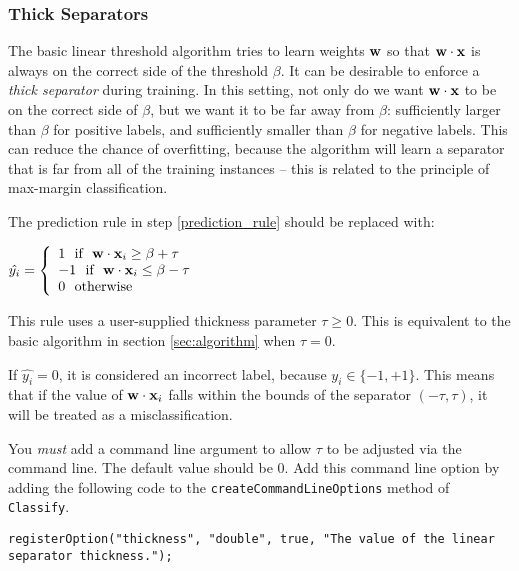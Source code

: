 \documentclass[11pt]{article}
\newcommand{\vw}{{\bf w}}
\newcommand{\vx}{{\bf x}}
\newcommand{\vxi}{{\bf x}_i}
\newcommand{\yi}{y_i}
\newcommand{\code}[1]{{\footnotesize \tt #1}}
\begin{document}
\subsubsection{Thick Separators}
\label{sec:thickness}

The basic linear threshold algorithm tries to learn weights $\vw$ so that $\vw \cdot \vx$ is always on the correct side of the threshold $\beta$. It can be desirable to enforce a {\em thick separator} during training. In this setting, not only do we want $\vw \cdot \vx$ to be on the correct side of $\beta$, but we want it to be far away from $\beta$: sufficiently larger than $\beta$ for positive labels, and sufficiently smaller than $\beta$ for negative labels.
This can reduce the chance of overfitting, because the algorithm will learn a separator that is far from all of the training instances -- this is related to the principle of max-margin classification.

The prediction rule in step \ref{prediction_rule} should be replaced with:

\vspace{0.5cm}
$\hat{\yi} =  \left\{
     \begin{array}{lr}
       1 ~~  \textrm{if} ~~ \vw \cdot \vxi \ge \beta + \tau  \\
       -1 ~~  \textrm{if} ~~ \vw \cdot \vxi \le \beta - \tau  \\
       0 ~~ \textrm{otherwise}
     \end{array}
   \right.$
\vspace{0.5cm}


This rule uses a user-supplied thickness parameter $\tau \ge 0$. This is equivalent to the basic algorithm in section \ref{sec:algorithm} when $\tau=0$.

If $\hat{\yi}=0$, it is considered an incorrect label, because $\yi \in \{-1,+1\}$. This means that if the value of $\vw \cdot \vxi$ falls within the bounds of the separator $(-\tau,\tau)$, it will be treated as a misclassification.

You {\em must} add a command line argument to allow $\tau$ to be adjusted via the command line. The default value should be 0.
Add this command line option by adding the following code to the \code{createCommandLineOptions} method of \code{Classify}.
\begin{footnotesize}
\begin{verbatim}
registerOption("thickness", "double", true, "The value of the linear separator thickness.");
\end{verbatim}
\end{footnotesize}
\end{document}

